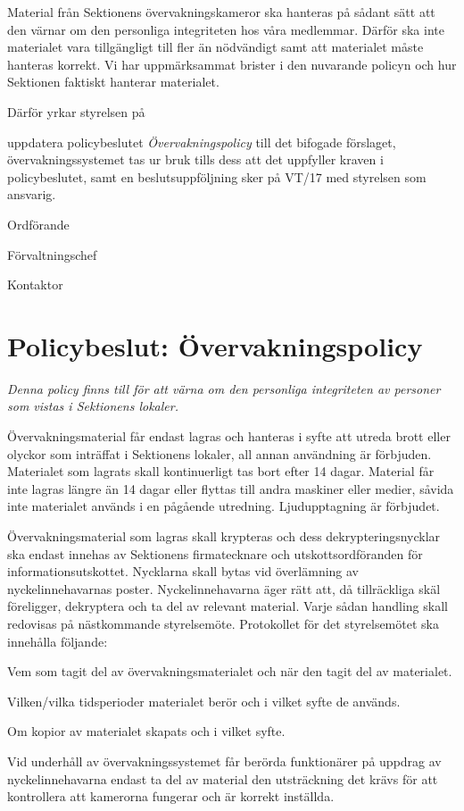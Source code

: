 \documentclass[../_main/handlingar.tex]{subfiles}
\begin{document}

Material från Sektionens övervakningskameror ska hanteras på sådant sätt att den värnar om den personliga integriteten hos våra medlemmar. Därför ska inte materialet vara tillgängligt till fler än nödvändigt samt att materialet måste hanteras korrekt. Vi har uppmärksammat brister i den nuvarande policyn och hur Sektionen faktiskt hanterar materialet.

Därför yrkar styrelsen på

\begin{attsatser}
    \att uppdatera policybeslutet \emph{Övervakningspolicy} till det bifogade förslaget,
    \att övervakningssystemet tas ur bruk tills dess att det uppfyller kraven i policybeslutet, samt
    \att en beslutsuppföljning sker på VT/17 med styrelsen som ansvarig.
\end{attsatser}

\begin{signatures}{3}
    \ist
    \signature{\ordf}{Ordförande}
    \signature{Anders Nilsson}{Förvaltningschef}
    \signature{\sekr}{Kontaktor}
\end{signatures}

\newpage
\section*{Policybeslut: Övervakningspolicy}
\emph{Denna policy finns till för att värna om den personliga integriteten av personer som vistas i Sektionens lokaler.}

Övervakningsmaterial får endast lagras och hanteras i syfte att utreda brott eller olyckor som inträffat i Sektionens lokaler, all annan användning är förbjuden. Materialet som lagrats skall kontinuerligt tas bort efter 14 dagar. Material får inte lagras längre än 14 dagar eller flyttas till andra maskiner eller medier, såvida inte materialet används i en pågående utredning. Ljudupptagning är förbjudet.

Övervakningsmaterial som lagras skall krypteras och dess dekrypteringsnycklar ska endast innehas av Sektionens firmatecknare och utskottsordföranden för informationsutskottet. Nycklarna skall bytas vid överlämning av nyckelinnehavarnas poster. Nyckelinnehavarna äger rätt att, då tillräckliga skäl föreligger, dekryptera och ta del av relevant material. Varje sådan handling skall redovisas på nästkommande styrelsemöte. Protokollet för det styrelsemötet ska innehålla följande:
\begin{dashlist}
    \item Vem som tagit del av övervakningsmaterialet och när den tagit del av materialet.
    \item Vilken/vilka tidsperioder materialet berör och i vilket syfte de används.
    \item Om kopior av materialet skapats och i vilket syfte.
\end{dashlist}

Vid underhåll av övervakningssystemet får berörda funktionärer på uppdrag av nyckelinnehavarna endast ta del av material den utsträckning det krävs för att kontrollera att kamerorna fungerar och är korrekt inställda.

\newpage
\end{document}
